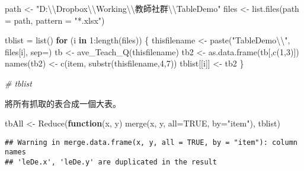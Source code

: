 \documentclass[
]{book}
\newenvironment{Shaded}{\begin{snugshade}}{\end{snugshade}}
\newcommand{\AttributeTok}[1]{\textcolor[rgb]{0.77,0.63,0.00}{#1}}
\newcommand{\CommentTok}[1]{\textcolor[rgb]{0.56,0.35,0.01}{\textit{#1}}}
\newcommand{\ConstantTok}[1]{\textcolor[rgb]{0.00,0.00,0.00}{#1}}
\newcommand{\ControlFlowTok}[1]{\textcolor[rgb]{0.13,0.29,0.53}{\textbf{#1}}}
\newcommand{\DecValTok}[1]{\textcolor[rgb]{0.00,0.00,0.81}{#1}}
\newcommand{\FunctionTok}[1]{\textcolor[rgb]{0.00,0.00,0.00}{#1}}
\newcommand{\NormalTok}[1]{#1}
\newcommand{\OtherTok}[1]{\textcolor[rgb]{0.56,0.35,0.01}{#1}}
\newcommand{\SpecialCharTok}[1]{\textcolor[rgb]{0.00,0.00,0.00}{#1}}
\newcommand{\StringTok}[1]{\textcolor[rgb]{0.31,0.60,0.02}{#1}}
\begin{document}
\begin{Shaded}
\begin{Highlighting}[]
\NormalTok{path }\OtherTok{\textless{}{-}} \StringTok{"D:}\SpecialCharTok{\textbackslash{}\textbackslash{}}\StringTok{Dropbox}\SpecialCharTok{\textbackslash{}\textbackslash{}}\StringTok{Working}\SpecialCharTok{\textbackslash{}\textbackslash{}}\StringTok{教師社群}\SpecialCharTok{\textbackslash{}\textbackslash{}}\StringTok{TableDemo"}
\NormalTok{files }\OtherTok{\textless{}{-}} \FunctionTok{list.files}\NormalTok{(}\AttributeTok{path =}\NormalTok{ path, }\AttributeTok{pattern =} \StringTok{"*.xlsx"}\NormalTok{)}

\NormalTok{tblist }\OtherTok{=} \FunctionTok{list}\NormalTok{()}
\ControlFlowTok{for}\NormalTok{ (i }\ControlFlowTok{in} \DecValTok{1}\SpecialCharTok{:}\FunctionTok{length}\NormalTok{(files)) \{}
\NormalTok{  thisfilename }\OtherTok{\textless{}{-}} \FunctionTok{paste}\NormalTok{(}\StringTok{"TableDemo}\SpecialCharTok{\textbackslash{}\textbackslash{}}\StringTok{"}\NormalTok{, files[i], }\AttributeTok{sep=}\StringTok{\textquotesingle{}\textquotesingle{}}\NormalTok{)}
\NormalTok{  tb }\OtherTok{\textless{}{-}} \FunctionTok{ave\_Teach\_Q}\NormalTok{(thisfilename)}
\NormalTok{  tb2 }\OtherTok{\textless{}{-}} \FunctionTok{as.data.frame}\NormalTok{(tb[,}\FunctionTok{c}\NormalTok{(}\DecValTok{1}\NormalTok{,}\DecValTok{3}\NormalTok{)])}
  \FunctionTok{names}\NormalTok{(tb2) }\OtherTok{\textless{}{-}} \FunctionTok{c}\NormalTok{(}\StringTok{\textquotesingle{}item\textquotesingle{}}\NormalTok{, }\FunctionTok{substr}\NormalTok{(thisfilename,}\DecValTok{4}\NormalTok{,}\DecValTok{7}\NormalTok{))}
\NormalTok{  tblist[[i]] }\OtherTok{\textless{}{-}}\NormalTok{ tb2}
\NormalTok{\}}

\CommentTok{\# tblist}
\end{Highlighting}
\end{Shaded}

將所有抓取的表合成一個大表。

\begin{Shaded}
\begin{Highlighting}[]
\NormalTok{tbAll }\OtherTok{\textless{}{-}} \FunctionTok{Reduce}\NormalTok{(}\ControlFlowTok{function}\NormalTok{(x, y) }\FunctionTok{merge}\NormalTok{(x, y, }\AttributeTok{all=}\ConstantTok{TRUE}\NormalTok{, }\AttributeTok{by=}\StringTok{"item"}\NormalTok{), tblist)}
\end{Highlighting}
\end{Shaded}

\begin{verbatim}
## Warning in merge.data.frame(x, y, all = TRUE, by = "item"): column names
## 'leDe.x', 'leDe.y' are duplicated in the result
\end{verbatim}
\end{document}
